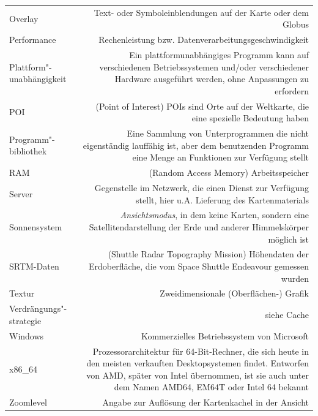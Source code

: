 \documentclass[10pt]{scrreprt}
\newcommand{\textref}[1]{\mbox{\raisebox{0.1ex}{\small$\rightarrow$ }\textit{#1}}}
\begin{document}
\begin{longtabu}{L{0.35} R{1.65}}
Overlay  & Text- oder Symboleinblendungen auf der Karte oder dem Globus\\
Performance & Rechenleistung bzw. Datenverarbeitungsgeschwindigkeit\\
Plattform"-unabhängigkeit & Ein plattformunabhängiges Programm kann auf verschiedenen Betriebssystemen und/oder verschiedener Hardware ausgeführt werden, ohne Anpassungen zu erfordern\\
POI  & (Point of Interest) POIs sind Orte auf der Weltkarte, die eine spezielle Bedeutung haben\\
Programm"-bibliothek & Eine Sammlung von Unterprogrammen die nicht eigenständig lauffähig ist, aber dem benutzenden Programm eine Menge an Funktionen zur Verfügung stellt\\
RAM & (Random Access Memory) Arbeitsspeicher\\
Server & Gegenstelle im Netzwerk, die einen Dienst zur Verfügung stellt, hier u.A. Lieferung des Kartenmaterials\\
Sonnensystem & \textref{Ansichtsmodus}, in dem keine Karten, sondern eine Satellitendarstellung der Erde und anderer Himmelskörper möglich ist\\
SRTM-Daten & (Shuttle Radar Topography Mission) Höhendaten der Erdoberfläche, die vom Space Shuttle Endeavour gemessen wurden\\
Textur & Zweidimensionale (Oberflächen-) Grafik\\
Verdrängungs"-strategie & siehe Cache\\
Windows & Kommerzielles Betriebssystem von Microsoft\\
x86\_64 & Prozessorarchitektur für 64-Bit-Rechner, die sich heute in den meisten verkauften Desktopsystemen findet. Entworfen von AMD, später von Intel übernommen, ist sie auch unter dem Namen AMD64, EM64T oder Intel 64 bekannt\\
Zoomlevel  & Angabe zur Auflösung der Kartenkachel in der Ansicht\\
\end{longtabu}


\cleardoublepage
{}
\printindex
\end{document}
